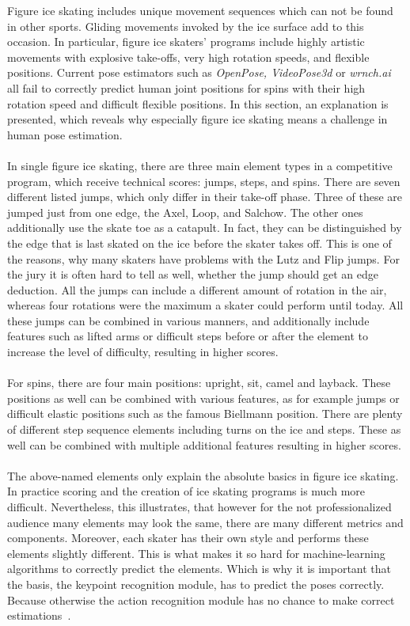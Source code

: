 Figure ice skating includes unique movement sequences which can not be found in other sports.
Gliding movements invoked by the ice surface add to this occasion.
In particular, figure ice skaters' programs include highly artistic
movements with explosive take-offs, very high rotation speeds, and flexible positions.
Current pose estimators such as \textit{OpenPose, VideoPose3d} or \textit{wrnch.ai} all fail to correctly predict
human joint positions
for spins with their high
rotation speed and difficult flexible positions.
In this section, an explanation is presented, which reveals why especially figure ice skating means a challenge in human pose estimation.
\\\mbox{}\\
In single figure ice skating, there are three main element types in a competitive program, which receive
technical scores:
jumps, steps, and spins.
There are seven different listed jumps, which only differ in their take-off phase.
Three
of these
are jumped just from one edge, the Axel, Loop, and Salchow.
The other ones additionally use the skate toe as a catapult.
In fact, they can be distinguished by the edge that is last skated on the ice before the skater takes off.
This is one of the reasons, why many skaters have problems with the Lutz and Flip jumps.
For the jury it is often hard to tell as well, whether the jump should get an edge deduction.
All the jumps can include a different amount of rotation in the air,
whereas four rotations were the maximum a skater could perform until today.
All these jumps can be combined in various manners, and additionally include features such as lifted arms or difficult steps
before or after the element to
increase the level of difficulty, resulting in higher scores.
\\\mbox{}\\
For spins, there are four main positions: upright, sit, camel and layback.
These positions as well can be combined with various features, as for example jumps or difficult elastic positions
such as the famous Biellmann position.
There are plenty of different step sequence elements including turns on the ice and steps.
These as well can be combined with multiple additional features resulting in higher scores.
\\\mbox{}\\
The above-named elements only explain the absolute basics in figure ice skating.
In practice scoring and the
creation of ice skating
programs is much more difficult.
Nevertheless, this illustrates, that however for the not professionalized
audience many elements may
look the same, there are many different metrics and components.
Moreover, each skater has their own style
and performs these elements
slightly different.
This is what makes it so hard for machine-learning algorithms to correctly predict the elements.
Which is
why it is important that
the basis, the keypoint recognition module, has to predict the poses correctly.
Because otherwise the action
recognition module has no
chance to make correct estimations~\cite{isuguideleinesgoe, isujudginssystem}.

